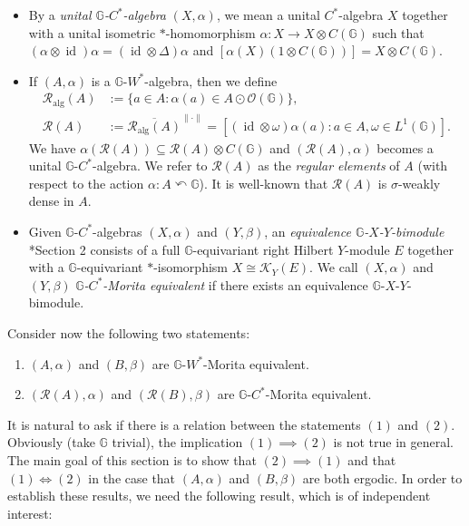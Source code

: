 \documentclass[reqno]{amsart}
\numberwithin{equation}{section}
\DeclareMathOperator{\id}{\mathrm{id}}
\newcommand{\G}{\mathbb{G}}
\begin{document}
\begin{itemize}
\item By a \emph{unital $\G$-$C^*$-algebra} $(X, \alpha)$, we mean a unital $C^*$-algebra $X$ together with a unital isometric $*$-homomorphism
$\alpha: X \to X \otimes C(\G)$
such that $(\alpha\otimes \id)\alpha = (\id \otimes \Delta)\alpha$ and $[\alpha(X)(1\otimes C(\G))]= X\otimes C(\G)$.
    \item If $(A, \alpha)$ is a $\G$-$W^*$-algebra, then we define
\begin{align*}
    \mathcal{R}_{\operatorname{alg}}(A)&:= \{a\in A: \alpha(a)\in A \odot \mathcal{O}(\G)\},\\
    \mathcal{R}(A)&:= \overline{\mathcal{R}_{\operatorname{alg}}(A)}^{\|\cdot\|}=[(\id \otimes \omega)\alpha(a): a \in A, \omega \in L^1(\G)].
\end{align*}
We have $\alpha(\mathcal{R}(A))\subseteq \mathcal{R}(A)\otimes C(\G)$ and $(\mathcal{R}(A), \alpha)$ becomes a unital $\G$-$C^*$-algebra. We refer to $\mathcal{R}(A)$ as the \emph{regular elements} of $A$ (with respect to the action $\alpha: A \curvearrowleft \G$). It is well-known that $\mathcal{R}(A)$ is $\sigma$-weakly dense in $A$.
\item  Given $\G$-$C^*$-algebras $(X, \alpha)$ and $(Y, \beta)$, an \emph{equivalence $\G$-$X$-$Y$-bimodule} \cite{NV10}*{Section 2} consists of a full $\G$-equivariant right Hilbert $Y$-module $E$ together with a $\G$-equivariant $*$-isomorphism $X \cong \mathcal{K}_Y(E)$. We call $(X, \alpha)$ and $(Y, \beta)$ \emph{$\G$-$C^*$-Morita equivalent} if there exists an equivalence $\G$-$X$-$Y$-bimodule.
\end{itemize}

Consider now the following two statements:
\begin{enumerate}\setlength\itemsep{-0.5em}
    \item $(A, \alpha)$ and $(B, \beta)$ are $\G$-$W^*$-Morita equivalent.
    \item $(\mathcal{R}(A), \alpha)$ and $(\mathcal{R}(B), \beta)$ are $\G$-$C^*$-Morita equivalent.
\end{enumerate}
It is natural to ask if there is a relation between the statements $(1)$ and $(2)$. Obviously (take $\G$ trivial), the implication $(1)\implies (2)$ is not true in general. The main goal of this section is to show that $(2)\implies (1)$ and that $(1)\iff (2)$ in the case that $(A, \alpha)$ and $(B, \beta)$ are both ergodic. In order to establish these results, we need the following result, which is of independent interest:
\end{document}
